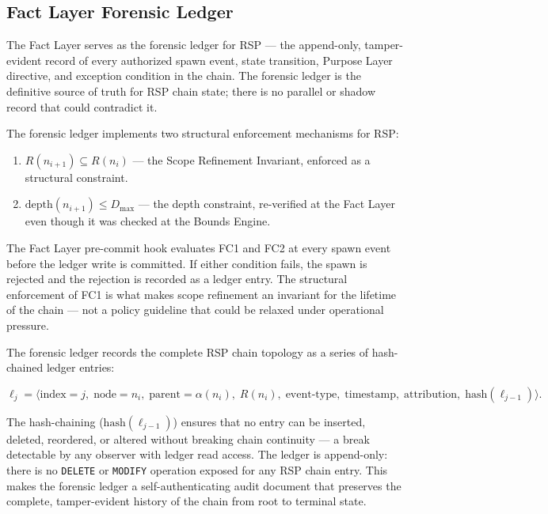 \subsection{Fact Layer Forensic Ledger}
\label{sec:rs-fact-layer}

The Fact Layer serves as the forensic ledger for RSP — the append-only, tamper-evident record of every authorized spawn event, state transition, Purpose Layer directive, and exception condition in the chain. The forensic ledger is the definitive source of truth for RSP chain state; there is no parallel or shadow record that could contradict it.

The forensic ledger implements two structural enforcement mechanisms for RSP:

\begin{enumerate}
    \item[(FC1)] $R(n_{i+1}) \subseteq R(n_i)$ — the Scope Refinement Invariant, enforced as a structural constraint.
    \item[(FC2)] $\text{depth}(n_{i+1}) \leq D_{\max}$ — the depth constraint, re-verified at the Fact Layer even though it was checked at the Bounds Engine.
\end{enumerate}

The Fact Layer pre-commit hook evaluates FC1 and FC2 at every spawn event before the ledger write is committed. If either condition fails, the spawn is rejected and the rejection is recorded as a ledger entry. The structural enforcement of FC1 is what makes scope refinement an invariant for the lifetime of the chain — not a policy guideline that could be relaxed under operational pressure.

The forensic ledger records the complete RSP chain topology as a series of hash-chained ledger entries:

\begin{equation}
\ell_j = \bigl\langle
\text{index}=j,\;
\text{node}=n_i,\;
\text{parent}=\alpha(n_i),\;
R(n_i),\;
\text{event-type},\;
\text{timestamp},\;
\text{attribution},\;
\text{hash}(\ell_{j-1})
\bigr\rangle .
\label{eq:rs-forensic-entry}
\end{equation}

The hash-chaining ($\text{hash}(\ell_{j-1})$) ensures that no entry can be inserted, deleted, reordered, or altered without breaking chain continuity — a break detectable by any observer with ledger read access. The ledger is append-only: there is no \texttt{DELETE} or \texttt{MODIFY} operation exposed for any RSP chain entry. This makes the forensic ledger a self-authenticating audit document that preserves the complete, tamper-evident history of the chain from root to terminal state.


